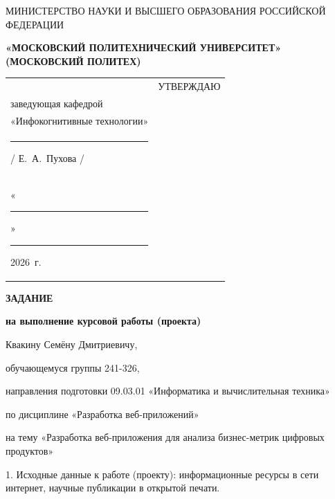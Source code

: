 \documentclass[14pt, a4paper]{extarticle}
\begin{document}
\pagestyle{empty}


\begin{center}
    {\small МИНИСТЕРСТВО НАУКИ И ВЫСШЕГО ОБРАЗОВАНИЯ РОССИЙСКОЙ ФЕДЕРАЦИИ}


    {\small \textbf{«МОСКОВСКИЙ ПОЛИТЕХНИЧЕСКИЙ УНИВЕРСИТЕТ»}} \\
    {\small \textbf{(МОСКОВСКИЙ ПОЛИТЕХ)}}
\end{center}

\begin{tabularx}{\textwidth}{@{} p{} p{} @{}}
     &
    \raggedright
    УТВЕРЖДАЮ                          \\
    заведующая кафедрой                \\
    «Инфокогнитивные технологии»       \\[0.3cm]

    \rule{3cm}{0.4pt} / Е.~А.~Пухова / \\[0.1cm]

    «\rule{0.8cm}{0.4pt}» \rule{3cm}{0.4pt} 2026~г.
\end{tabularx}


\begin{center}

    { \large \textbf{ЗАДАНИЕ}}

    \textbf{на выполнение курсовой работы (проекта)}

    Квакину Семёну Дмитриевичу, %

\end{center}

обучающемуся группы 241-326,

направления подготовки 09.03.01 «Информатика и вычислительная техника»

по дисциплине «Разработка веб-приложений»

на тему «Разработка веб-приложения для анализа бизнес-метрик цифровых продуктов»

1. Исходные данные к работе (проекту): информационные ресурсы в сети
интернет, научные публикации в открытой печати.
\end{document}
